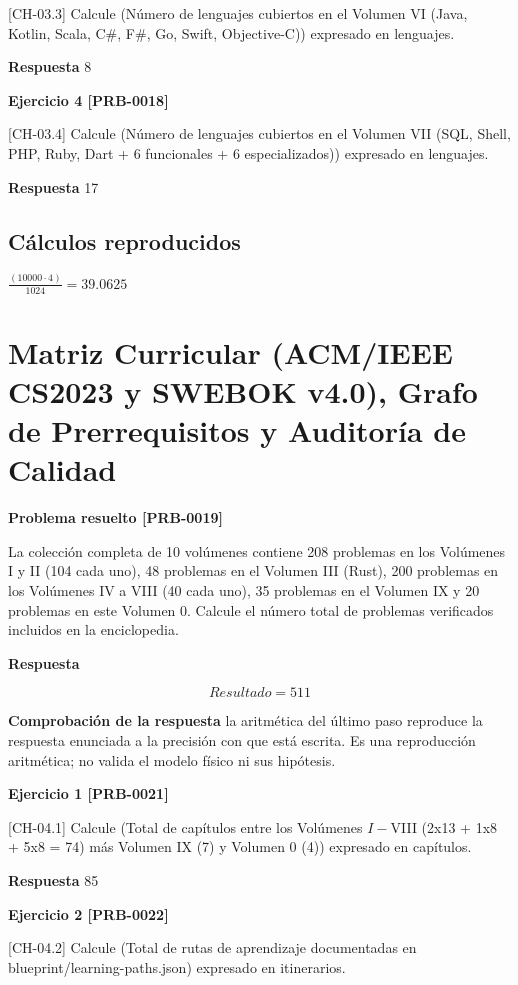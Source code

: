 \documentclass{book}
\begin{document}
[CH-03.3] Calcule (Número de lenguajes cubiertos en el Volumen VI (Java, Kotlin, Scala, C\#, F\#, Go, Swift, Objective-C)) expresado en lenguajes.

\noindent\textbf{Respuesta} 8

\noindent\textbf{Ejercicio 4 [PRB-0018]}

[CH-03.4] Calcule (Número de lenguajes cubiertos en el Volumen VII (SQL, Shell, PHP, Ruby, Dart + 6 funcionales + 6 especializados)) expresado en lenguajes.

\noindent\textbf{Respuesta} 17

\subsection*{Cálculos reproducidos}

\(\frac{\left(10000\cdot 4\right)}{1024} = 39.0625\)

\section{Matriz Curricular (ACM/IEEE CS2023 y SWEBOK v4.0), Grafo de Prerrequisitos y Auditoría de Calidad}

\noindent\textbf{Problema resuelto [PRB-0019]}

La colección completa de 10 volúmenes contiene 208 problemas en los Volúmenes I y II (104 cada uno), 48 problemas en el Volumen III (Rust), 200 problemas en los Volúmenes IV a VIII (40 cada uno), 35 problemas en el Volumen IX y 20 problemas en este Volumen 0. Calcule el número total de problemas verificados incluidos en la enciclopedia.

\noindent\textbf{Respuesta}

\[
Resultado = 511
\]

\noindent\textbf{Comprobación de la respuesta} la aritmética del último paso reproduce la respuesta enunciada a la precisión con que está escrita. Es una reproducción aritmética; no valida el modelo físico ni sus hipótesis.

\noindent\textbf{Ejercicio 1 [PRB-0021]}

[CH-04.1] Calcule (Total de capítulos entre los Volúmenes \(I-\)VIII (2x13 + 1x8 + 5x8 = 74) más Volumen IX (7) y Volumen 0 (4)) expresado en capítulos.

\noindent\textbf{Respuesta} 85

\noindent\textbf{Ejercicio 2 [PRB-0022]}

[CH-04.2] Calcule (Total de rutas de aprendizaje documentadas en blueprint/learning-paths.json) expresado en itinerarios.
\end{document}
